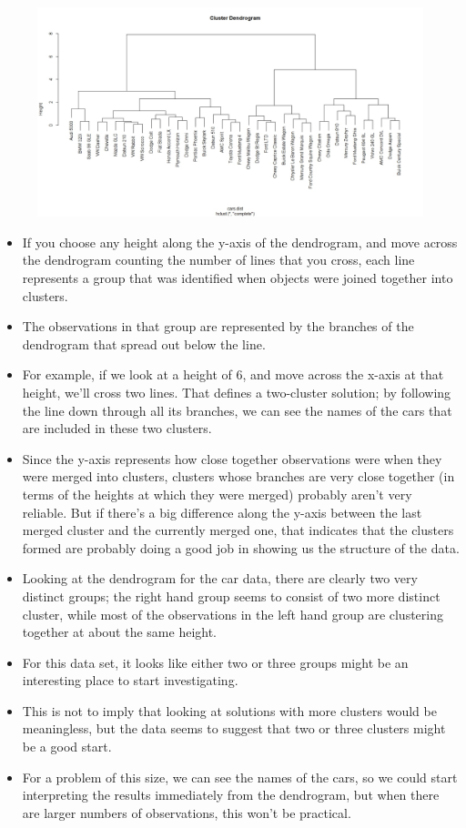 \documentclass[12pt]{article}
\begin{document}
\begin{figure}[h!]
\centering
\includegraphics[width=0.9\linewidth]{./Carsdendro2}

\label{fig:Carsdendro2}
\end{figure}

\begin{itemize}
\item If you choose any height along the y-axis of the dendrogram, and move across the dendrogram counting the number of lines that you cross, each line represents a group that was identified when objects were joined together into clusters.
\item  The observations in that group are represented by the branches of the dendrogram that spread out below the line.
\item  For example, if we look at a height of 6, and move across the x-axis at that height, we'll cross two lines. That defines a two-cluster solution; by following the line down through all its branches, we can see the names of the cars that are included in these two clusters. 
\item Since the y-axis represents how close together observations were when they were merged into clusters, clusters whose branches are very close together (in terms of the heights at which they were merged) probably aren't very reliable. But if there's a big difference along the y-axis between the last merged cluster and the currently merged one, that indicates that the clusters formed are probably doing a good job in showing us the structure of the data.
\end{itemize}

\newpage
\begin{itemize}
\item  Looking at the dendrogram for the car data, there are clearly two very distinct groups; the right hand group seems to consist of two more distinct cluster, while most of the observations in the left hand group are clustering together at about the same height.
\item For this data set, it looks like either two or three groups might be an interesting place to start investigating. 
\item This is not to imply that looking at solutions with more clusters would be meaningless, but the data seems to suggest that two or three clusters might be a good start.
\item For a problem of this size, we can see the names of the cars, so we could start interpreting the results immediately from the dendrogram, but when there are larger numbers of observations, this won't be practical.
\end{itemize}
\newpage
\end{document}
